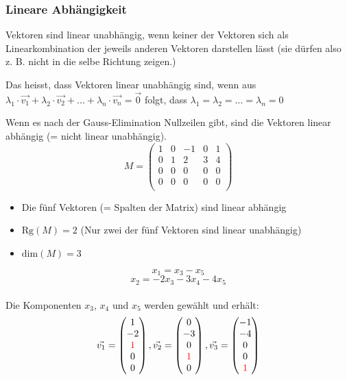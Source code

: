 \subsubsection{Lineare Abhängigkeit}
Vektoren sind linear unabhängig, wenn keiner der Vektoren sich
als Linearkombination der jeweils anderen Vektoren darstellen lässt
(sie dürfen also z. B. nicht in die selbe Richtung zeigen.)

Das heisst, dass Vektoren linear unabhängig sind, wenn aus $\lambda_1 \cdot \vec{v_1} +
\lambda_2 \cdot \vec{v_2} + ... + \lambda_n \cdot \vec{v_n} = \vec{0}$
folgt, dass $\lambda_1 = \lambda_2 = ... = \lambda_n = 0$

Wenn es nach der Gauss-Elimination Nullzeilen gibt, sind die Vektoren
linear abhängig (= nicht linear unabhängig). 
\[ M = \begin {pmatrix}
  1  &  0  &  -1  &  0  &  1  \\
  0  &  1  &   2  &  3  &  4  \\
  0  &  0  &   0  &  0  &  0  \\
  0  &  0  &   0  &  0  &  0  \\
\end {pmatrix} \]
\begin{itemize}
  \item Die fünf Vektoren (= Spalten der Matrix) sind linear abhängig
  \item \( \text{Rg}(M) = 2\) (Nur zwei der fünf Vektoren sind linear unabhängig)
  \item \( \text{dim}(M) = 3\)
\end{itemize}
\[ x_1 = x_3 - x_5 \]
\[ x_2 = -2x_3 - 3x_4 - 4x_5 \]
\\ Die Komponenten $x_3$, $x_4$ und $x_5$ werden gewählt und erhält:
\[   
  \vec{v_1} = \begin {pmatrix} 1 \\ -2 \\ \color{red}{1} \\ 0 \\ 0 \end {pmatrix}, 
  \vec{v_2} = \begin {pmatrix} 0 \\ -3 \\ 0 \\ \color{red}{1} \\ 0 \end {pmatrix}, 
  \vec{v_3} = \begin {pmatrix} -1 \\ -4 \\ 0 \\ 0 \\ \color{red}{1} \end {pmatrix} 
\]

